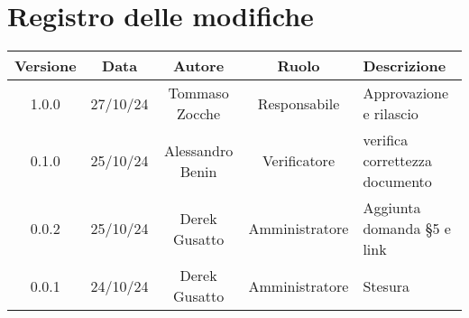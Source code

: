 
\section*{Registro delle modifiche}
\begin{table}[H]
    \begin{tabular}{|c|c|c|c|p{4cm}|}
        \hline
         \textbf{Versione} &  \textbf{Data} &  \textbf{Autore} &  \textbf{Ruolo} & \textbf{Descrizione} \\
          \hline
          1.0.0 & 27/10/24 & Tommaso Zocche & Responsabile & Approvazione e rilascio\\
          \hline
          0.1.0& 25/10/24 & Alessandro Benin  & Verificatore  & verifica correttezza documento  \\
          \hline
          0.0.2& 25/10/24 & Derek Gusatto & Amministratore & Aggiunta domanda §5 e link  \\
          \hline
          0.0.1& 24/10/24 & Derek Gusatto & Amministratore & Stesura \\
          \hline
    \end{tabular}
\end{table}